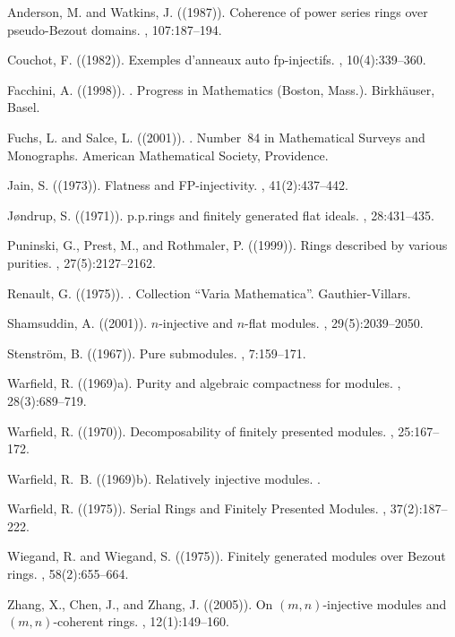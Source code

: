 \documentclass{amsart}
\begin{document}
\begin{thebibliography}{}

Anderson, M. and Watkins, J. ((1987)).
\newblock Coherence of power series rings over pseudo-{B}ezout domains.
, 107:187--194.

Couchot, F. ((1982)).
\newblock Exemples d'anneaux auto fp-injectifs.
, 10(4):339--360.

Facchini, A. ((1998)).
.
\newblock Progress in Mathematics (Boston, Mass.). Birkh\"auser, Basel.

Fuchs, L. and Salce, L. ((2001)).
.
\newblock Number~84 in Mathematical Surveys and Monographs. American
  Mathematical Society, Providence.

Jain, S. ((1973)).
\newblock Flatness and {FP}-injectivity.
, 41(2):437--442.

J\o{}ndrup, S. ((1971)).
\newblock p.p.rings and finitely generated flat ideals.
, 28:431--435.

Puninski, G., Prest, M., and Rothmaler, P. ((1999)).
\newblock Rings described by various purities.
, 27(5):2127--2162.

Renault, G. ((1975)).
.
\newblock Collection ``Varia Mathematica''. Gauthier-Villars.

Shamsuddin, A. ((2001)).
\newblock $n$-injective and $n$-flat modules.
, 29(5):2039--2050.

Stenstr\"om, B. ((1967)).
\newblock Pure submodules.
, 7:159--171.

Warfield, R. ((1969)a).
\newblock Purity and algebraic compactness for modules.
, 28(3):689--719.

Warfield, R. ((1970)).
\newblock Decomposability of finitely presented modules.
, 25:167--172.

Warfield, R.~B. ((1969)b).
\newblock Relatively injective modules.
.

Warfield, R. ((1975)).
\newblock Serial Rings and Finitely Presented Modules.
, 37(2):187--222.

Wiegand, R. and Wiegand, S. ((1975)).
\newblock Finitely generated modules over {B}ezout rings.
, 58(2):655--664.

Zhang, X., Chen, J., and Zhang, J. ((2005)).
\newblock On $(m,n)$-injective modules and $(m,n)$-coherent rings.
, 12(1):149--160.

\end{thebibliography}
\end{document}
